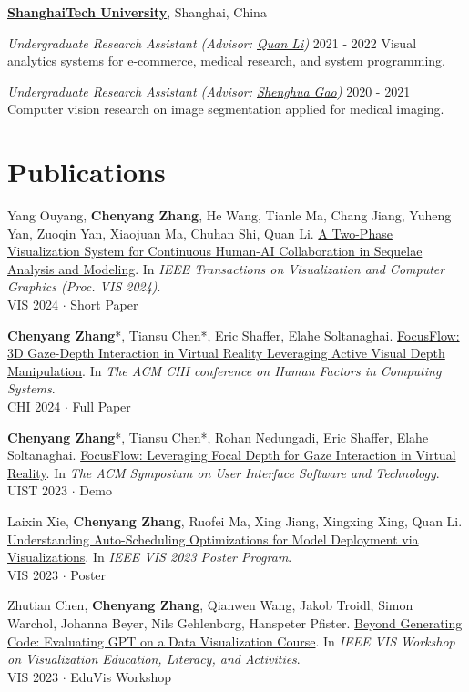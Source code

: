 \documentclass[margin,line]{res}
\newcommand{\SectionTitle}[1]{
\vspace{-.1cm}
\section{#1}
\vspace{.2cm}
}
\newcommand{\institute}[3]{{\bf #1}, #2, #3}
\newcommand{\academicexperience}[3]{
  \vspace{-.2cm}
  {\em #1} \hfill #2 \newline
  #3
}
\newcommand{\PubItem}[5]{
  \vspace{-.2cm}
  #2. \href{#3}{\textcolor{themecolor}{#1}}. In \textit{#4}. \\ {#5}
}
\begin{document}
\begin{resume}
\vspace{-.1cm}
\institute{\href{https://www.shanghaitech.edu.cn/eng/}{ShanghaiTech University}}{Shanghai}{China}
\vspace{-.1cm}

\academicexperience
{Undergraduate Research Assistant (Advisor: \href{https://faculty.sist.shanghaitech.edu.cn/liquan/}{Quan Li})}
{2021 - 2022}
{Visual analytics systems for e-commerce, medical research, and system programming.}

\academicexperience
{Undergraduate Research Assistant (Advisor: \href{https://svip-lab.github.io/}{Shenghua Gao})}
{2020 - 2021}
{Computer vision research on image segmentation applied for medical imaging.}


\SectionTitle{Publications}

\PubItem{A Two-Phase Visualization System for Continuous Human-AI Collaboration in Sequelae Analysis and Modeling}
{Yang Ouyang, \textbf{Chenyang Zhang}, He Wang, Tianle Ma, Chang Jiang, Yuheng Yan, Zuoqin Yan, Xiaojuan Ma, Chuhan Shi, Quan Li}
{https://arxiv.org/abs/2407.14769}
{IEEE Transactions on Visualization and Computer Graphics (Proc. VIS 2024)}
{VIS 2024 $\cdot$ Short Paper}

\PubItem{FocusFlow: 3D Gaze-Depth Interaction in Virtual Reality Leveraging Active Visual Depth Manipulation}
{\textbf{Chenyang Zhang}*, Tiansu Chen*, Eric Shaffer, Elahe Soltanaghai}
{https://dl.acm.org/doi/10.1145/3613904.3642589}
{The ACM CHI conference on Human Factors in Computing Systems}
{CHI 2024 $\cdot$ Full Paper}

\PubItem{FocusFlow: Leveraging Focal Depth for Gaze Interaction in Virtual Reality}
{\textbf{Chenyang Zhang}*, Tiansu Chen*, Rohan Nedungadi, Eric Shaffer, Elahe Soltanaghai}
{https://dl.acm.org/doi/10.1145/3586182.3615818}
{The ACM Symposium on User Interface Software and Technology}
{UIST 2023 $\cdot$ Demo}

\PubItem{Understanding Auto-Scheduling Optimizations for Model Deployment via Visualizations}
{Laixin Xie, \textbf{Chenyang Zhang}, Ruofei Ma, Xing Jiang, Xingxing Xing, Quan Li}
{https://arxiv.org/abs/2308.04724}
{IEEE VIS 2023 Poster Program}
{VIS 2023 $\cdot$ Poster}

\PubItem{Beyond Generating Code: Evaluating GPT on a Data Visualization Course}
{Zhutian Chen, \textbf{Chenyang Zhang}, Qianwen Wang, Jakob Troidl, Simon Warchol, Johanna Beyer, Nils Gehlenborg, Hanspeter Pfister}
{https://arxiv.org/abs/2306.02914}
{IEEE VIS Workshop on Visualization Education, Literacy, and Activities}
{VIS 2023 $\cdot$ EduVis Workshop}


\end{resume}
\end{document}

